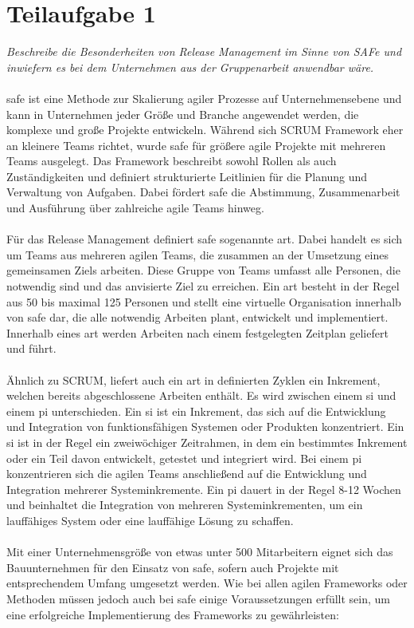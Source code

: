 \chapter{Teilaufgabe 1}

\textit{Beschreibe die Besonderheiten von Release Management im Sinne von SAFe und inwiefern es bei dem Unternehmen aus der Gruppenarbeit anwendbar wäre.}
\\
\\
\ac{safe} ist eine Methode zur Skalierung agiler Prozesse auf Unternehmensebene und kann in Unternehmen jeder Größe und Branche angewendet werden, die komplexe und große Projekte entwickeln. Während sich SCRUM Framework eher an kleinere Teams richtet, wurde \ac{safe} für größere agile Projekte mit mehreren Teams ausgelegt. Das Framework beschreibt sowohl Rollen als auch Zuständigkeiten und definiert strukturierte Leitlinien für die Planung und Verwaltung von Aufgaben. Dabei fördert \ac{safe} die Abstimmung, Zusammenarbeit und Ausführung über zahlreiche agile Teams hinweg. {\cite{ref01}}
\\
\\
Für das Release Management definiert \ac{safe} sogenannte \ac{art}. Dabei handelt es sich um Teams aus mehreren agilen Teams, die zusammen an der Umsetzung eines gemeinsamen Ziels arbeiten. Diese Gruppe von Teams umfasst alle Personen, die notwendig sind und das anvisierte Ziel zu erreichen. Ein \ac{art} besteht in der Regel aus 50 bis maximal 125 Personen und stellt eine virtuelle Organisation innerhalb von \ac{safe} dar, die alle notwendig Arbeiten plant, entwickelt und implementiert. Innerhalb eines \ac{art} werden Arbeiten nach einem festgelegten Zeitplan geliefert und führt. {\cite{ref02}}
\\
\\
Ähnlich zu SCRUM, liefert auch ein \ac{art} in definierten Zyklen ein Inkrement, welchen bereits abgeschlossene Arbeiten enthält. Es wird zwischen einem \ac{si} und einem \ac{pi} unterschieden. Ein \ac{si} ist ein Inkrement, das sich auf die Entwicklung und Integration von funktionsfähigen Systemen oder Produkten konzentriert. Ein \ac{si} ist in der Regel ein zweiwöchiger Zeitrahmen, in dem ein bestimmtes Inkrement oder ein Teil davon entwickelt, getestet und integriert wird. Bei einem \ac{pi} konzentrieren sich die agilen Teams anschließend auf die Entwicklung und Integration mehrerer Systeminkremente. Ein \ac{pi} dauert in der Regel 8-12 Wochen und beinhaltet die Integration von mehreren Systeminkrementen, um ein lauffähiges System oder eine lauffähige Lösung zu schaffen. {\cite{ref03}}
\\
\\
Mit einer Unternehmensgröße von etwas unter 500 Mitarbeitern eignet sich das Bauunternehmen für den Einsatz von \ac{safe}, sofern auch Projekte mit entsprechendem Umfang umgesetzt werden. Wie bei allen agilen Frameworks oder Methoden müssen jedoch auch bei \ac{safe} einige Voraussetzungen erfüllt sein, um eine erfolgreiche Implementierung des Frameworks zu gewährleisten:

